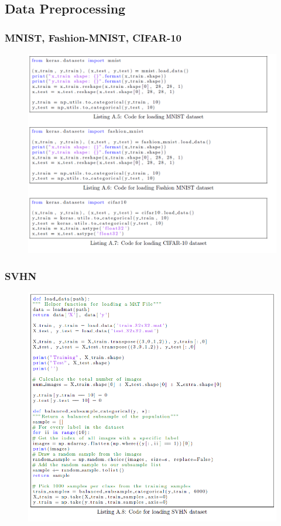 \documentclass{beamer}
\begin{document}
\subsection{Data Preprocessing}
\begin{frame}[fragile]\frametitle{MNIST, Fashion-MNIST, CIFAR-10}
\begin{figure}[h]
	\includegraphics[scale=0.3]{figures/loaddata}
	\centering
	\label{fig:loaddata}
\end{figure}
\end{frame}
\begin{frame}\frametitle{SVHN}
\begin{figure}[h]
	\includegraphics[scale=0.3]{figures/loadsvhn}
	\centering
	\label{fig:loadsvhn}
\end{figure}
\end{frame}
\end{document}
